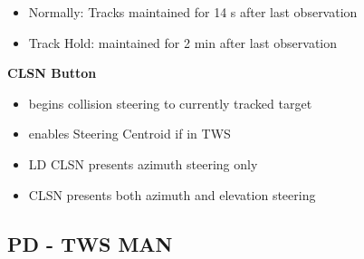 \documentclass[fontSpartan]{TechCheck}
\begin{document}
\begin{longtableitemize}
{\begin{subitemize}
\begin{itemize}
				\item Normally: Tracks maintained for 14 s after last observation
				\item Track Hold: maintained for 2 min after last observation
			\end{itemize}
			\item \textbf{CLSN Button}
			\begin{itemize}
				\item begins collision steering to currently tracked target
				\item enables Steering Centroid if in TWS
				\item LD CLSN presents azimuth steering only
				\item CLSN presents both azimuth and elevation steering
			\end{itemize}
		\end{subitemize}}
	\end{longtableitemize}

	\clearpage

	\subsection{PD - TWS MAN}
	
\end{document}
